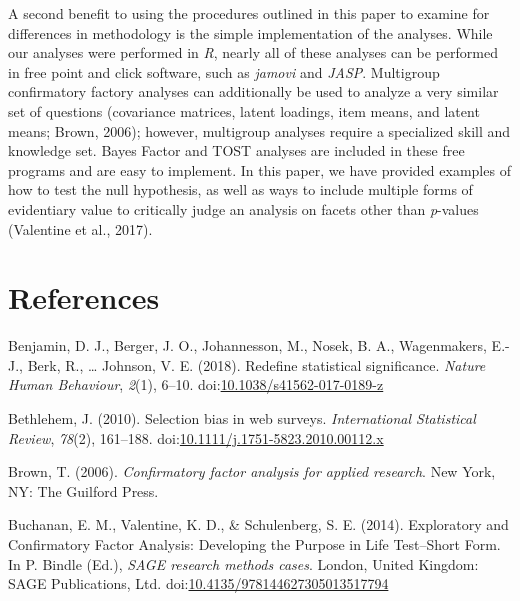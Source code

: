 \documentclass[english,man, mask]{apa6}
\theoremstyle{definition}
\theoremstyle{definition}
\theoremstyle{definition}
\theoremstyle{remark}
\begin{document}
A second benefit to using the procedures outlined in this paper to
examine for differences in methodology is the simple implementation of
the analyses. While our analyses were performed in \emph{R}, nearly all
of these analyses can be performed in free point and click software,
such as \emph{jamovi} and \emph{JASP}. Multigroup confirmatory factory
analyses can additionally be used to analyze a very similar set of
questions (covariance matrices, latent loadings, item means, and latent
means; Brown, 2006); however, multigroup analyses require a specialized
skill and knowledge set. Bayes Factor and TOST analyses are included in
these free programs and are easy to implement. In this paper, we have
provided examples of how to test the null hypothesis, as well as ways to
include multiple forms of evidentiary value to critically judge an
analysis on facets other than \emph{p}-values (Valentine et al., 2017).

\newpage

\section{References}\label{references}

\setlength{\parindent}{-0.5in} \setlength{\leftskip}{0.5in}

\hypertarget{refs}{}
\hypertarget{ref-Benjamin2017}{}
Benjamin, D. J., Berger, J. O., Johannesson, M., Nosek, B. A.,
Wagenmakers, E.-J., Berk, R., \ldots{} Johnson, V. E. (2018). Redefine
statistical significance. \emph{Nature Human Behaviour}, \emph{2}(1),
6--10.
doi:\href{https://doi.org/10.1038/s41562-017-0189-z}{10.1038/s41562-017-0189-z}

\hypertarget{ref-Bethlehem2010}{}
Bethlehem, J. (2010). Selection bias in web surveys. \emph{International
Statistical Review}, \emph{78}(2), 161--188.
doi:\href{https://doi.org/10.1111/j.1751-5823.2010.00112.x}{10.1111/j.1751-5823.2010.00112.x}

\hypertarget{ref-Brown2006}{}
Brown, T. (2006). \emph{Confirmatory factor analysis for applied
research}. New York, NY: The Guilford Press.

\hypertarget{ref-Buchanan2014}{}
Buchanan, E. M., Valentine, K. D., \& Schulenberg, S. E. (2014).
Exploratory and Confirmatory Factor Analysis: Developing the Purpose in
Life Test--Short Form. In P. Bindle (Ed.), \emph{SAGE research methods
cases}. London, United Kingdom: SAGE Publications, Ltd.
doi:\href{https://doi.org/10.4135/978144627305013517794}{10.4135/978144627305013517794}
\end{document}
